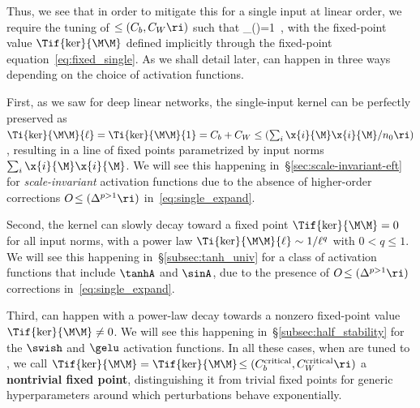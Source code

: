 Thus, we see that in order to mitigate this  for a single input at linear order, we require the tuning of  $\le(C_b, C_W\ri)$ such that
\be\label{eq:parallel_criticality}
 \chi_{\parallel}\!\le(\Tif{\ker}{\M\M}\ri)=1\, ,
\ee
with the fixed-point value $\Tif{\ker}{\M\M}$ 
defined implicitly through the fixed-point equation~\eqref{eq:fixed_single}.
As we shall detail later,  can happen in three ways depending on the choice of activation functions. 
\bi
\item First, as we saw for deep linear networks, the single-input kernel can be perfectly preserved as $\Ti{\ker}{\M\M}{\ell} =\Ti{\ker}{\M\M}{1}=C_b+C_W\le(\sum_i \x{i}{\M}\x{i}{\M}/n_{0}\ri)$,
resulting in a line of fixed points parametrized by input norms $\sum_i \x{i}{\M}\x{i}{\M}$. We will see this happening in~\S\ref{sec:scale-invariant-eft} for \emph{scale-invariant} activation functions due to the absence of higher-order corrections $O\!\le(\Delta^{p>1}\ri)$ in~\eqref{eq:single_expand}. 
\item Second, the kernel can slowly decay toward a fixed point $\Tif{\ker}{\M\M}=0$ for all input norms, with a power law $\Ti{\ker}{\M\M}{\ell}\sim1/\ell^q$ with $0<q\leq 1$. We will see this happening in~\S\ref{subsec:tanh_univ} for a class of activation functions that include $\tanhA$ and $\sinA$, due to the presence of $O\!\le(\Delta^{p>1}\ri)$ corrections in~\eqref{eq:single_expand}. 
\item Third,  can happen with a power-law decay towards a nonzero fixed-point value $\Tif{\ker}{\M\M}\ne0$. We will see this happening in~\S\ref{subsec:half_stability} for the $\swish$ and $\gelu$ activation functions.
\ei
In all these cases, when  are tuned to , we call $\Tif{\ker}{\M\M}=\Tif{\ker}{\M\M}\!\le(C_b^{\text{critical}}, C_W^{\text{critical}}\ri)$ a \textbf{nontrivial fixed point}, distinguishing it from trivial fixed points for generic hyperparameters around which perturbations behave exponentially.




